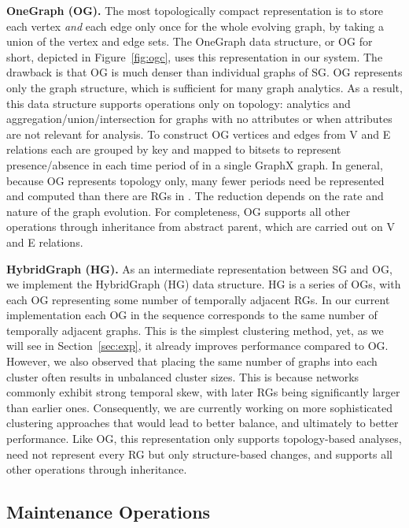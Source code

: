 {\bf OneGraph (OG).}  The most topologically compact representation is
to store each vertex {\em and} each edge only once for the whole
evolving graph, by taking a union of the vertex and edge sets.  The
OneGraph data structure, or OG for short, depicted in
Figure~\ref{fig:ogc}, uses this representation in our system.  The
drawback is that OG is much denser than individual graphs of SG.  OG
represents only the graph structure, which is sufficient for many
graph analytics.  As a result, this data structure supports
operations only on topology: analytics and aggregation/union/intersection
for graphs with no attributes or when attributes are not relevant for
analysis.  To construct OG vertices and edges from V and E relations
each are grouped by key and mapped to bitsets to represent
presence/absence in each time period of \tg in a single GraphX graph.
In general, because OG represents topology only, many fewer periods
need be represented and computed than there are RGs in \tg.  The
reduction depends on the rate and nature of the graph evolution.  For
completeness, OG supports all other operations through inheritance
from abstract parent, which are carried out on V and E relations.

{\bf HybridGraph (HG).} As an intermediate representation between SG
and OG, we implement the HybridGraph (HG) data structure.  HG is a
series of OGs, with each OG representing some number of temporally
adjacent RGs.  In our current implementation each OG in the sequence
corresponds to the same number of temporally adjacent graphs.  This is
the simplest clustering method, yet, as we will see in
Section~\ref{sec:exp}, it already improves performance compared to OG.
However, we also observed that placing the same number of graphs into
each cluster often results in unbalanced cluster sizes.  This is
because networks commonly exhibit strong temporal skew, with later RGs
being significantly larger than earlier ones.  Consequently, we are
currently working on more sophisticated clustering approaches that
would lead to better balance, and ultimately to better performance.
Like OG, this representation only supports topology-based analyses,
need not represent every RG but only structure-based changes, and
supports all other operations through inheritance.

\subsection{Maintenance Operations}
\label{sec:sys:maint}

